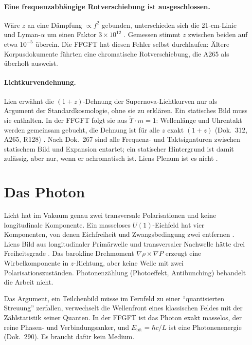 \paragraph{Eine frequenzabhängige Rotverschiebung ist ausgeschlossen.}
Wäre $z$ an eine Dämpfung $\propto f^2$ gebunden, unterschieden sich die
21-cm-Linie und Lyman-$\alpha$ um einen Faktor $3\times10^{12}$ \KM. Gemessen
stimmt $z$ zwischen beiden auf etwa $10^{-5}$ überein. Die FFGFT hat diesen
Fehler selbst durchlaufen: Ältere Korpusdokumente führten eine chromatische
Rotverschiebung, die A265 als überholt ausweist.

\paragraph{Lichtkurvendehnung.}
Lien erwähnt die $(1+z)$-Dehnung der Supernova-Lichtkurven nur als Argument
der Standardkosmologie, ohne sie zu erklären. Ein statisches Bild muss sie
enthalten. In der FFGFT folgt sie aus $\tilde T\cdot m=1$: Wellenlänge und
Uhrentakt werden gemeinsam gebucht, die Dehnung ist für alle $z$ exakt
$(1+z)$ (Dok.~312, A265, R128) \BM. Nach Dok.~267 sind alle Frequenz- und
Taktsignaturen zwischen statischem Bild und Expansion entartet; ein
statischer Hintergrund ist damit zulässig, aber nur, wenn er achromatisch
ist. Liens Plenum ist es nicht \XM.

\section{Das Photon}

Licht hat im Vakuum genau zwei transversale Polarisationen und keine
longitudinale Komponente. Ein masseloses $U(1)$-Eichfeld hat vier
Komponenten, von denen Eichfreiheit und Zwangsbedingung zwei entfernen
\BM. Liens Bild aus longitudinaler Primärwelle und transversaler Nachwelle
hätte drei Freiheitsgrade \XM. Das barokline Drehmoment
$\nabla\rho\times\nabla P$ erzeugt eine Wirbelkomponente in $z$-Richtung,
aber keine Welle mit zwei Polarisationszuständen. Photonenzählung
(Photoeffekt, Antibunching) behandelt die Arbeit nicht.

Das Argument, ein Teilchenbild müsse im Fernfeld zu einer
\enquote{quantisierten Streuung} zerfallen, verwechselt die Wellenfront
eines klassischen Feldes mit der Zählstatistik seiner Quanten. In der FFGFT
ist das Photon exakt masselos, der reine Phasen- und Verbindungsanker, und
$E_\text{bit}=\hbar c/L$ ist eine Photonenenergie (Dok.~290). Es braucht dafür
kein Medium.

